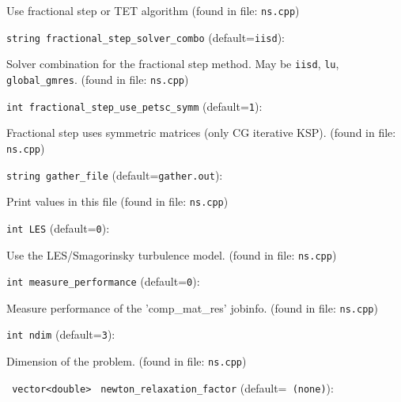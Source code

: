 Use fractional step or TET algorithm
 (found in file: \verb+ns.cpp+)
\item\verb+string fractional_step_solver_combo+ {\rm(default=\verb|iisd|)}:

Solver combination for the fractional step method. May be \verb+iisd+, 
 \verb+lu+, \verb+global_gmres+. 
 (found in file: \verb+ns.cpp+)
\item\verb+int fractional_step_use_petsc_symm+ {\rm(default=\verb|1|)}:

Fractional step uses symmetric matrices (only CG iterative KSP).
 (found in file: \verb+ns.cpp+)
\item\verb+string gather_file+ {\rm(default=\verb|gather.out|)}:

Print values in this file 
 (found in file: \verb+ns.cpp+)
\item\verb+int LES+ {\rm(default=\verb|0|)}:

Use the LES/Smagorinsky turbulence model. 
 (found in file: \verb+ns.cpp+)
\item\verb+int measure_performance+ {\rm(default=\verb|0|)}:

Measure performance of the 'comp\_mat\_res' jobinfo. 
 (found in file: \verb+ns.cpp+)
\item\verb+int ndim+ {\rm(default=\verb|3|)}:

Dimension of the problem.
 (found in file: \verb+ns.cpp+)
\item\verb+ vector<double>+ \verb+ newton_relaxation_factor+ {\rm(default=\verb| (none)|)}:

